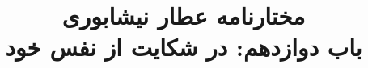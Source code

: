\documentclass[14pt,b5paper]{article}
\begin{document}
\title{\Huge مختارنامه عطار نیشابوری \\
باب دوازدهم: در شکایت از نفس خود}
\author{ }
\date{ }
\maketitle
\newpage
\tableofcontents
\newpage

\newpage

\newpage

\newpage

\newpage

\newpage

\newpage

\newpage

\newpage

\newpage

\newpage

\newpage

\newpage

\newpage

\newpage

\newpage

\newpage

\newpage

\newpage

\newpage

\newpage

\newpage

\newpage

\newpage

\newpage

\newpage

\newpage

\newpage

\newpage

\newpage

\newpage

\newpage

\newpage

\newpage

\newpage

\newpage
\end{document}
